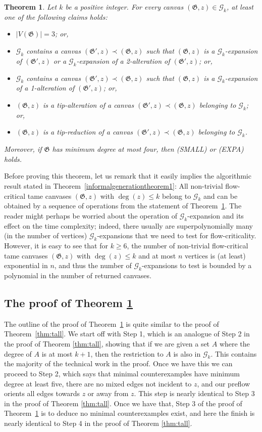 \documentclass{article}
\newcommand{\GG}{\mathcal{G}}
\newcommand\g{\mathfrak{G}}
\newtheorem{theorem}{Theorem}[section]
\begin{document}
\begin{theorem}\label{thm-gen}
Let $k$ be a positive integer.  For every canvas $(\g,z)\in\GG_k$, at least one of the following claims holds:
\begin{itemize}[align=left]
\item[(SMALL)] $|V(\g)|=3$; or,
\item[(EXPA)] $\GG_k$ contains a canvas $(\g',z)\prec (\g,z)$ such that $(\g,z)$ is a $\GG_k$-expansion of $(\g',z)$ or
a $\GG_k$-expansion of a 2-alteration of $(\g',z)$; or,
\item[(EXPB)] $\GG_k$ contains a canvas $(\g',z)\prec (\g,z)$ such that $(\g,z)$ is a $\GG_k$-expansion of a 1-alteration of $(\g',z)$; or,
\item[(ADD)] $(\g,z)$ is a tip-alteration of a canvas $(\g',z)\prec (\g,z)$ belonging to $\GG_k$; or,
\item[(REM)] $(\g,z)$ is a tip-reduction of a canvas $(\g',z)\prec (\g,z)$ belonging to $\GG_k$.
\end{itemize}
Moreover, if $\g$ has minimum degree at most four, then (SMALL) or (EXPA) holds.
\end{theorem}

Before proving this theorem, let us remark that it easily implies the algorithmic result stated in Theorem~\ref{informalgenerationtheorem1}:
All non-trivial flow-critical tame canvases $(\g,z)$ with $\deg(z) \leq k$ belong to $\GG_k$ and can be obtained by a sequence
of operations from the statement of Theorem~\ref{thm-gen}.  The reader might perhaps be worried about the operation of
$\GG_k$-expansion and its effect on the time complexity; indeed, there usually are superpolynomially many (in the number of vertices)
$\GG_k$-expansions that we need to test for flow-criticality.  However, it is easy to see that for $k\ge 6$, the number of non-trivial flow-critical tame canvases $(\g,z)$ with $\deg(z) \leq k$
and at most $n$ vertices is (at least) exponential in $n$, and thus the number of $\GG_k$-expansions to test is bounded by a polynomial in the number
of returned canvases.

\subsection{The proof of Theorem \ref{thm-gen}}\label{subsec:canv-gen}
The outline of the proof of Theorem~\ref{thm-gen} is quite similar to the proof of Theorem~\ref{thm:tall}.  We start off with Step 1, which is  an analogue of Step 2 in the proof of Theorem \ref{thm:tall}, showing that if we are given a set $A$ where the degree of $A$ is at most $k+1$, then the restriction to $A$ is also in $\GG_{k}$. This contains the majority of the technical work in the proof. 
 Once we have this we can proceed to Step 2, which says that minimal counterexamples have minimum degree at least five, there are no mixed edges not incident to $z$, and our preflow orients all edges towards $z$ or away from $z$. This step is nearly identical to Step $3$ in the proof of Theorem \ref{thm:tall}. 
Once we have that, Step 3 of the proof of Theorem~\ref{thm-gen} is to deduce no minimal counterexamples exist, and here the finish is nearly identical to Step 4 in the proof of Theorem \ref{thm:tall}.
\end{document}
